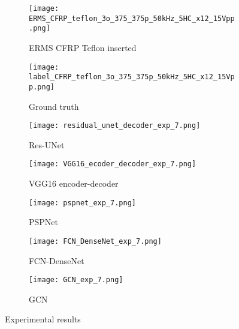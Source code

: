\begin{figure} [!h]
	\centering
	\begin{subfigure}[b]{0.47\textwidth}
		\centering
		\texttt{[image: ERMS\_CFRP\_teflon\_3o\_375\_375p\_50kHz\_5HC\_x12\_15Vpp.png]}
		\caption{ERMS CFRP Teflon inserted}
		\label{fig:Delamination}
	\end{subfigure}			
	\hfill
	\begin{subfigure}[b]{0.47\textwidth}
		\centering 	
		\texttt{[image: label\_CFRP\_teflon\_3o\_375\_375p\_50kHz\_5HC\_x12\_15Vpp.png]}
		\caption{Ground truth} 
		\label{fig:damage_label}
	\end{subfigure}
	\hfill
	\begin{subfigure}[b]{0.47\textwidth}
		\centering
		\texttt{[image: residual\_unet\_decoder\_exp\_7.png]}
		\caption{Res-UNet} 
		\label{fig:unet_exp_7_}
	\end{subfigure}
	\hfill
	\begin{subfigure}[b]{0.47\textwidth}
		\centering
		\texttt{[image: VGG16\_ecoder\_decoder\_exp\_7.png]}
		\caption{VGG16 encoder-decoder} 
		\label{fig:vgg16_exp_7_}
	\end{subfigure}
	\hfill
	\begin{subfigure}[b]{0.47\textwidth}
		\centering
		\texttt{[image: pspnet\_exp\_7.png]}
		\caption{PSPNet} 
		\label{fig:pspnet_exp_7_}
	\end{subfigure}
	\hfill
	\begin{subfigure}[b]{0.47\textwidth}
		\centering
		\texttt{[image: FCN\_DenseNet\_exp\_7.png]}
		\caption{FCN-DenseNet} 
		\label{fig:fcn_densenet_exp}
	\end{subfigure}
	\hfill
	\begin{subfigure}[b]{0.47\textwidth}
		\centering
		\texttt{[image: GCN\_exp\_7.png]}
		\caption{GCN} 
		\label{fig:gcn_exp}
	\end{subfigure}
	\caption{Experimental results}
	\label{fig:Exp_ERMS_teflon}
\end{figure}

